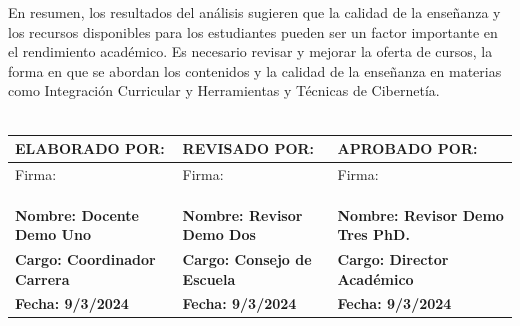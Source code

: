 En resumen, los resultados del análisis sugieren que la calidad de la enseñanza y los recursos disponibles para los estudiantes pueden ser un factor importante en el rendimiento académico. Es necesario revisar y mejorar la oferta de cursos, la forma en que se abordan los contenidos y la calidad de la enseñanza en materias como Integración Curricular y Herramientas y Técnicas de Cibernetía.\\
\vspace{1cm}\\\begin{tabularx}{\textwidth}{|X|X|X|}
\hline
\textbf{ELABORADO POR:} & \textbf{REVISADO POR:} & \textbf{APROBADO POR:} \\ \hline
Firma: & Firma: & Firma:\\
&&\\
&&\\
&&\\ \hline
\textbf{Nombre: Docente Demo Uno} & \textbf{Nombre: Revisor Demo Dos} & \textbf{Nombre: Revisor Demo Tres PhD.} \\ \hline
\textbf{Cargo: Coordinador Carrera} & \textbf{Cargo: Consejo de Escuela} & \textbf{Cargo: Director Académico} \\ \hline
\textbf{Fecha: 9/3/2024} & \textbf{Fecha: 9/3/2024} & \textbf{Fecha: 9/3/2024} \\ \hline
\end{tabularx}
